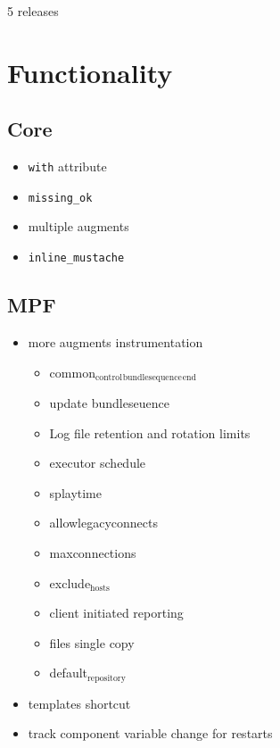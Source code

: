 \documentclass[11pt]{article}
\begin{document}
5 releases

\section*{Functionality}
\label{sec:org7815b15}
\subsection*{Core}
\label{sec:org2732a34}
\begin{itemize}
\item \texttt{with} attribute
\item \texttt{missing\_ok}
\item multiple augments
\item \texttt{inline\_mustache}
\end{itemize}
\subsection*{MPF}
\label{sec:orgc7ba929}
\begin{itemize}
\item more augments instrumentation
\begin{itemize}
\item common\(_{\text{control}}\)\(_{\text{bundlesequence}}\)\(_{\text{end}}\)
\item update bundleseuence
\item Log file retention and rotation limits
\item executor schedule
\item splaytime
\item allowlegacyconnects
\item maxconnections
\item exclude\(_{\text{hosts}}\)
\item client initiated reporting
\item files single copy
\item default\(_{\text{repository}}\)
\end{itemize}
\item templates shortcut
\item track component variable change for restarts
\end{itemize}
\end{document}
